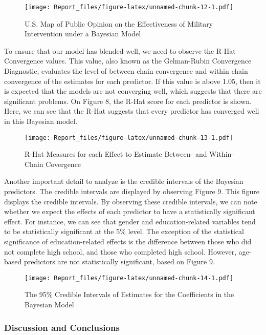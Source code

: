 \documentclass[
  11pt,
]{article}
\begin{document}
\begin{figure}
\centering
\texttt{[image: Report\_files/figure-latex/unnamed-chunk-12-1.pdf]}
\caption{U.S. Map of Public Opinion on the Effectiveness of Military
Intervention under a Bayesian Model}
\end{figure}

To ensure that our model has blended well, we need to observe the R-Hat
Convergence values. This value, also known as the Gelman-Rubin
Convergence Diagnostic, evaluates the level of between chain convergence
and within chain convergence of the estimates for each predictor. If
this value is above 1.05, then it is expected that the models are not
converging well, which suggests that there are significant problems. On
Figure 8, the R-Hat score for each predictor is shown. Here, we can see
that the R-Hat suggests that every predictor has converged well in this
Bayesian model.

\begin{figure}
\centering
\texttt{[image: Report\_files/figure-latex/unnamed-chunk-13-1.pdf]}
\caption{R-Hat Measures for each Effect to Estimate Between- and
Within-Chain Covergence}
\end{figure}

Another important detail to analyze is the credible intervals of the
Bayesian predictors. The credible intervals are displayed by observing
Figure 9. This figure displays the credible intervals. By observing
these credible intervals, we can note whether we expect the effects of
each predictor to have a statistically significant effect. For instance,
we can see that gender and education-related variables tend to be
statistically significant at the 5\% level. The exception of the
statistical significance of education-related effects is the difference
between those who did not complete high school, and those who completed
high school. However, age-based predictors are not statistically
significant, based on Figure 9.

\begin{figure}
\centering
\texttt{[image: Report\_files/figure-latex/unnamed-chunk-14-1.pdf]}
\caption{The 95\% Credible Intervals of Estimates for the Coefficients
in the Bayesian Model}
\end{figure}

\hypertarget{discussion-and-conclusions}{%
\subsubsection{Discussion and
Conclusions}\label{discussion-and-conclusions}}
\end{document}
